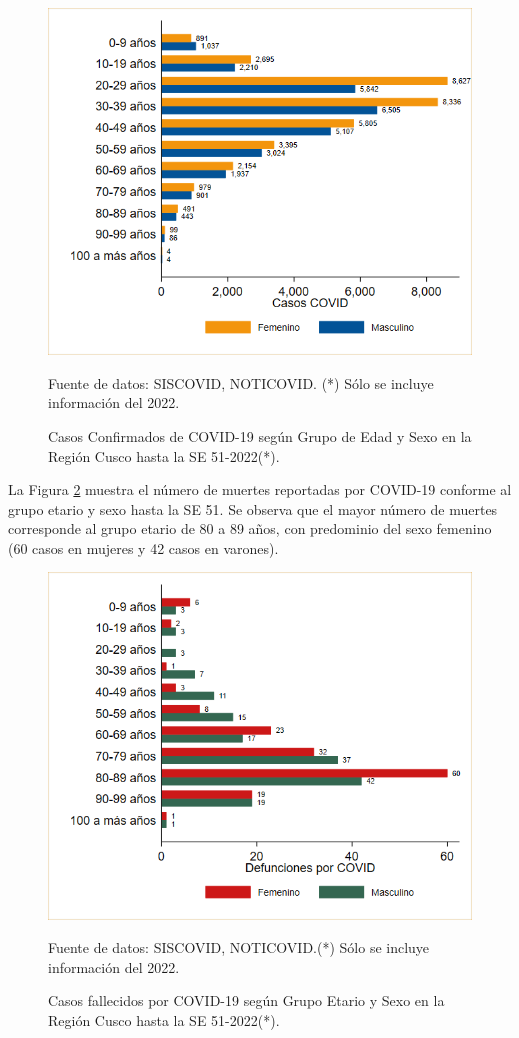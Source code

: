 \documentclass[12pt,a4paper,openany]{book}
\begin{document}
	\begin{figure}[h]
		\caption{Casos Confirmados de COVID-19 según Grupo de Edad y Sexo en la Región Cusco hasta la SE 51-2022(*).}\label{fig:casos_edad_sexo}
		\begin{center}
			\includegraphics[width=0.75\linewidth]{../figuras/casos_etapavida_2022}
		\end{center}
		{\footnotesize {Fuente de datos: SISCOVID, NOTICOVID. (*) Sólo se incluye información del 2022.}}
	\end{figure}
	\pagebreak
	
	
	La Figura \ref{fig:fallecidos_edad_sexo} muestra el número de muertes reportadas por COVID-19 conforme al grupo etario y sexo hasta la SE 51.  Se observa que el mayor número de muertes corresponde al grupo etario de 80 a 89 años, con predominio del sexo femenino (60 casos en mujeres y 42 casos en varones).
%	
	\begin{figure}[h]
		\caption{Casos fallecidos por COVID-19 según Grupo Etario y Sexo en la Región Cusco hasta la SE 51-2022(*).}\label{fig:fallecidos_edad_sexo}
		\begin{center}
			\includegraphics[width=0.75\linewidth]{../figuras/defunciones_etapavida_2022}
		\end{center}
		{\footnotesize {Fuente de datos: SISCOVID, NOTICOVID.(*) Sólo se incluye información del 2022.}}
	\end{figure}
%	
	
\end{document}
